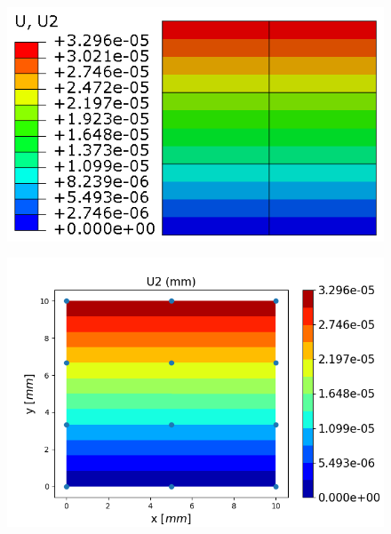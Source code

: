 \documentclass[12pt]{article}
\begin{document}
\begin{figure}[H]
	\centering
	\begin{minipage}{.5\textwidth}
		\centering
		\includegraphics[width=1\linewidth]{EME23U2.png}
		\label{EME23U2}
	\end{minipage}%
	\begin{minipage}{.6\textwidth}
		\centering
		\includegraphics[width=1\linewidth]{EME23U2_IGA.png}
		\label{EME23U2_IGA}
	\end{minipage}
\end{figure}
\end{document}
